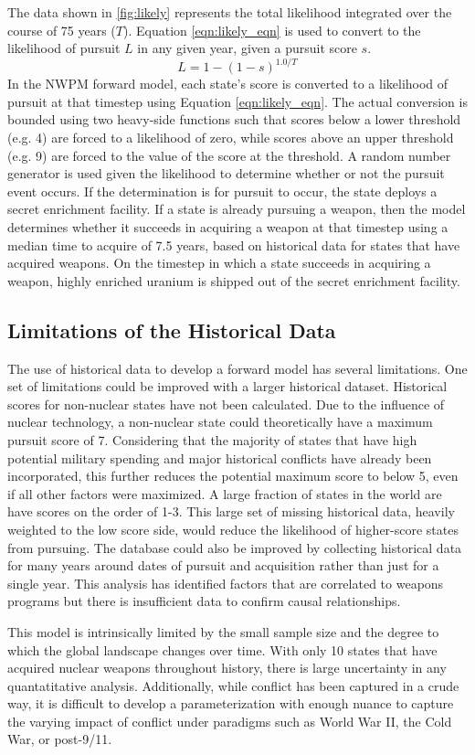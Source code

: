 The data shown in \ref{fig:likely} represents the total likelihood integrated over the course of 75 years ($T$). Equation \ref{eqn:likely_eqn} is used to convert to the likelihood of pursuit $L$ in any given year, given a pursuit score $s$.
\begin{equation}
L = 1 - (1 - s)^{1.0/T}
\label{eqn:likely_eqn}
\end{equation}
In the \gls{NWPM} forward model, each state's score is converted to a likelihood of pursuit at that timestep using Equation \ref{eqn:likely_eqn}. The actual conversion is bounded using two heavy-side functions such that scores below a lower threshold (e.g. 4) are forced to a likelihood of zero, while scores above an upper threshold (e.g. 9) are forced to the value of the score at the threshold.   A random number generator is used given the likelihood to determine whether or not the pursuit event occurs. If the determination is for pursuit to occur, the state deploys a secret enrichment facility. If a state is already pursuing a weapon, then the model determines whether it succeeds in acquiring a weapon at that timestep using a median time to acquire of 7.5 years, based on historical data for states that have acquired weapons. On the timestep in which a state succeeds in acquiring a weapon, highly enriched uranium is shipped out of the secret enrichment facility.

\subsection{Limitations of the Historical Data}
The use of historical data to develop a forward model has several limitations. One set of limitations could be improved with a larger historical dataset.  Historical scores for non-nuclear states have not been calculated. Due to the influence of nuclear technology, a non-nuclear state could theoretically have a maximum pursuit score of 7. Considering that the majority of states that have high potential military spending and major historical conflicts have already been incorporated, this further reduces the potential maximum score to below 5, even if all other factors were maximized.  A large fraction of states in the world are have scores on the order of 1-3.  This large set of missing historical data, heavily weighted to the low score side, would reduce the likelihood of higher-score states from pursuing.  The database could also be improved by collecting historical data for many years around dates of pursuit and acquisition rather than just for a single year. This analysis has identified factors that are correlated to weapons programs but there is insufficient data to confirm causal relationships.   

This model is intrinsically limited by the small sample size and the degree to which the global landscape changes over time. With only 10 states that have acquired nuclear weapons throughout history, there is large uncertainty in any quantatitative analysis. Additionally, while conflict has been captured in a crude way, it is difficult to develop a parameterization with enough nuance to capture the varying impact of conflict under paradigms such as World War II, the Cold War, or post-9/11.

